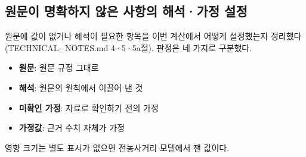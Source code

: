 \documentclass[10.5pt,a4paper]{article}
\begin{document}
\subsection{원문이 명확하지 않은 사항의 해석·가정 설정}\label{sec:assume}
원문에 값이 없거나 해석이 필요한 항목을 이번 계산에서 어떻게 설정했는지 정리했다(TECHNICAL\_NOTES.md 4·5·5a절). 판정은 네 가지로 구분했다.
\begin{itemize}
\item \textbf{원문}: 원문 규정 그대로
\item \textbf{해석}: 원문의 원칙에서 이끌어 낸 것
\item \textbf{미확인 가정}: 자료로 확인하기 전의 가정
\item \textbf{가정값}: 근거 수치 자체가 가정
\end{itemize}
영향 크기는 별도 표시가 없으면 전농사거리 모델에서 잰 값이다.
\footnotesize
\end{document}
